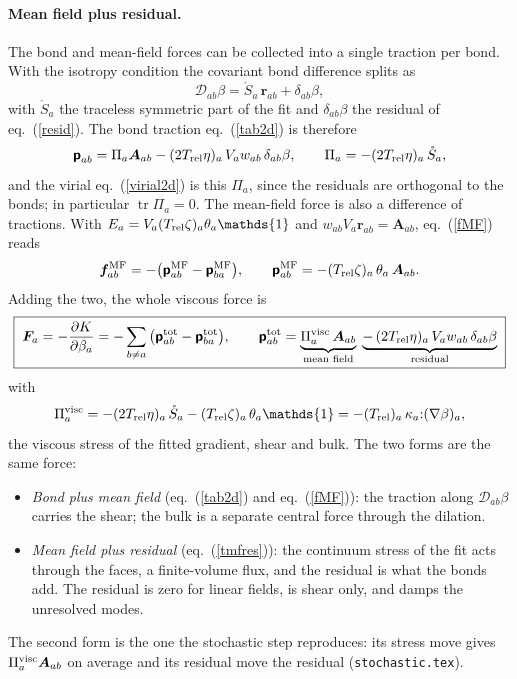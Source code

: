 \documentclass[11pt,aps,preprint,nofootinbib,superscriptaddress,tightenlines]{revtex4-2}
\def\st{\begin{equation}}
\def\stp{\end{equation}}
\def\Eq#1{eq.~(\ref{#1})}
\providecommand{\tr}{\operatorname{tr}}
\newcommand{\one}{\mathds{1}}
\newcommand{\pf}{\bm{\mathsf p}}
\let\oldparagraph\paragraph
\renewcommand{\paragraph}{\par\bigskip\oldparagraph}
\begin{document}
\paragraph{Mean field plus residual.}  The bond and mean-field forces can be
collected into a single traction per bond.  With the isotropy condition the
covariant bond difference splits as
\st
\mathcal D_{ab}\beta=\mathring S_a\,\bm r_{ab}+\delta_{ab}\beta ,
\stp
with $\mathring S_a$ the traceless symmetric part of the fit and $\delta_{ab}\beta$ the
residual of \Eq{resid}.  The bond traction \Eq{tab2d} is therefore
\st
\pf_{ab}=\Pi_a\bm A_{ab}-(2T_{\rm rel}\eta)_a\,V_aw_{ab}\,\delta_{ab}\beta,
\qquad \Pi_a=-(2T_{\rm rel}\eta)_a\,\mathring S_a ,
\stp
and the virial \Eq{virial2d} is this $\Pi_a$, since the residuals are orthogonal
to the bonds; in particular $\tr\Pi_a=0$.  The mean-field force is also a
difference of tractions.  With $E_a=V_a(T_{\rm rel}\zeta)_a\theta_a\one$ and
$w_{ab}V_a\bm r_{ab}=\bm A_{ab}$, \Eq{fMF} reads
\st
\bm f^{\rm MF}_{ab}=-\big(\pf^{\rm MF}_{ab}-\pf^{\rm MF}_{ba}\big),\qquad
\pf^{\rm MF}_{ab}=-(T_{\rm rel}\zeta)_a\,\theta_a\,\bm A_{ab} .
\stp
Adding the two, the whole viscous force is
\st
\boxed{\;\bm F_a=-\frac{\partial K}{\partial\beta_a}=-\sum_{b\neq a}\big(\pf^{\rm tot}_{ab}-\pf^{\rm tot}_{ba}\big),\qquad
\pf^{\rm tot}_{ab}=\underbrace{\Pi^{\rm visc}_a\,\bm A_{ab}}_{\text{mean field}}
\;\underbrace{-\,(2T_{\rm rel}\eta)_a\,V_aw_{ab}\,\delta_{ab}\beta}_{\text{residual}}\;}
\label{tmfres}
\stp
with
\st
\Pi^{\rm visc}_a=-(2T_{\rm rel}\eta)_a\,\mathring S_a-(T_{\rm rel}\zeta)_a\,\theta_a\one
=-(T_{\rm rel})_a\,\kappa_a{:}(\nabla\beta)_a ,
\stp
the viscous stress of the fitted gradient, shear and bulk.  The two forms are
the same force:
\begin{itemize}
\item \emph{Bond plus mean field} (\Eq{tab2d} and \Eq{fMF}): the traction along
  $\mathcal D_{ab}\beta$ carries the shear; the bulk is a separate central force
  through the dilation.
\item \emph{Mean field plus residual} (\Eq{tmfres}): the continuum stress of the
  fit acts through the faces, a finite-volume flux, and the residual is what the
  bonds add.  The residual is zero for linear fields, is shear only, and damps
  the unresolved modes.
\end{itemize}
The second form is the one the stochastic step reproduces: its stress move
gives $\Pi^{\rm visc}_a\bm A_{ab}$ on average and its residual move the residual
(\texttt{stochastic.tex}).
\end{document}
